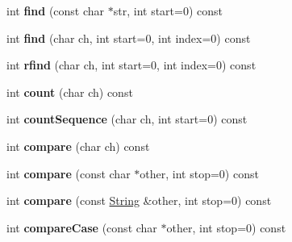 \begin{DoxyCompactItemize}
\item 
int {\bfseries find} (const char $\ast$str, int start=0) const \hypertarget{class_magnum_1_1_string_ad11db2fc5996f6b68236df74a36c1c76}{}\label{class_magnum_1_1_string_ad11db2fc5996f6b68236df74a36c1c76}

\item 
int {\bfseries find} (char ch, int start=0, int index=0) const \hypertarget{class_magnum_1_1_string_a9de1993500994518282e3687b44c047b}{}\label{class_magnum_1_1_string_a9de1993500994518282e3687b44c047b}

\item 
int {\bfseries rfind} (char ch, int start=0, int index=0) const \hypertarget{class_magnum_1_1_string_a077a73453dd8f542cc9a0de99325f1e5}{}\label{class_magnum_1_1_string_a077a73453dd8f542cc9a0de99325f1e5}

\item 
int {\bfseries count} (char ch) const \hypertarget{class_magnum_1_1_string_acc631ddb1797928109f7c23054e9b3f2}{}\label{class_magnum_1_1_string_acc631ddb1797928109f7c23054e9b3f2}

\item 
int {\bfseries count\+Sequence} (char ch, int start=0) const \hypertarget{class_magnum_1_1_string_adc3572a0f62de9520902f7e1d131a6f8}{}\label{class_magnum_1_1_string_adc3572a0f62de9520902f7e1d131a6f8}

\item 
int {\bfseries compare} (char ch) const \hypertarget{class_magnum_1_1_string_a810f7c45be1c5f8c089c7bec0f2fe788}{}\label{class_magnum_1_1_string_a810f7c45be1c5f8c089c7bec0f2fe788}

\item 
int {\bfseries compare} (const char $\ast$other, int stop=0) const \hypertarget{class_magnum_1_1_string_a0c853af6c68ebd59ff53ccc251609183}{}\label{class_magnum_1_1_string_a0c853af6c68ebd59ff53ccc251609183}

\item 
int {\bfseries compare} (const \hyperlink{class_magnum_1_1_string}{String} \&other, int stop=0) const \hypertarget{class_magnum_1_1_string_a27e247ad23cf915516ac101daf1e3913}{}\label{class_magnum_1_1_string_a27e247ad23cf915516ac101daf1e3913}

\item 
int {\bfseries compare\+Case} (const char $\ast$other, int stop=0) const \hypertarget{class_magnum_1_1_string_a8103f52cb90824a0b8d78dce4af90b03}{}\label{class_magnum_1_1_string_a8103f52cb90824a0b8d78dce4af90b03}


\end{DoxyCompactItemize}
